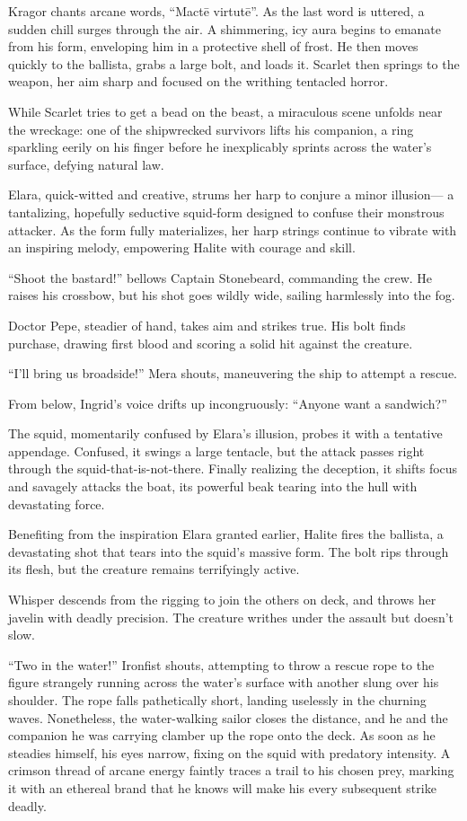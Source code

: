 \documentclass[
  letterpaper,12pt,twoside,twocolumn,openany,
  nodeprecatedcode,bg=full]{dndbook}
\begin{document}
Kragor chants arcane words, ``Mactē virtutē''. As the last word is
uttered, a sudden chill surges through the air. A shimmering, icy aura
begins to emanate from his form, enveloping him in a protective shell of
frost. He then moves quickly to the ballista, grabs a large bolt, and
loads it. Scarlet then springs to the weapon, her aim sharp and focused
on the writhing tentacled horror.

While Scarlet tries to get a bead on the beast, a miraculous scene
unfolds near the wreckage: one of the shipwrecked survivors lifts his
companion, a ring sparkling eerily on his finger before he inexplicably
sprints across the water's surface, defying natural law.

Elara, quick-witted and creative, strums her harp to conjure a minor
illusion--- a tantalizing, hopefully seductive squid-form designed to
confuse their monstrous attacker. As the form fully materializes, her
harp strings continue to vibrate with an inspiring melody, empowering
Halite with courage and skill.

``Shoot the bastard!'' bellows Captain Stonebeard, commanding the crew.
He raises his crossbow, but his shot goes wildly wide, sailing
harmlessly into the fog.

Doctor Pepe, steadier of hand, takes aim and strikes true. His bolt
finds purchase, drawing first blood and scoring a solid hit against the
creature.

``I'll bring us broadside!'' Mera shouts, maneuvering the ship to
attempt a rescue.

From below, Ingrid's voice drifts up incongruously: ``Anyone want a
sandwich?''

The squid, momentarily confused by Elara's illusion, probes it with a
tentative appendage. Confused, it swings a large tentacle, but the
attack passes right through the squid-that-is-not-there. Finally
realizing the deception, it shifts focus and savagely attacks the boat,
its powerful beak tearing into the hull with devastating force.

Benefiting from the inspiration Elara granted earlier, Halite fires the
ballista, a devastating shot that tears into the squid's massive form.
The bolt rips through its flesh, but the creature remains terrifyingly
active.

Whisper descends from the rigging to join the others on deck, and throws
her javelin with deadly precision. The creature writhes under the
assault but doesn't slow.

``Two in the water!'' Ironfist shouts, attempting to throw a rescue rope
to the figure strangely running across the water's surface with another
slung over his shoulder. The rope falls pathetically short, landing
uselessly in the churning waves. Nonetheless, the water-walking sailor
closes the distance, and he and the companion he was carrying clamber up
the rope onto the deck. As soon as he steadies himself, his eyes narrow,
fixing on the squid with predatory intensity. A crimson thread of arcane
energy faintly traces a trail to his chosen prey, marking it with an
ethereal brand that he knows will make his every subsequent strike
deadly.
\end{document}
